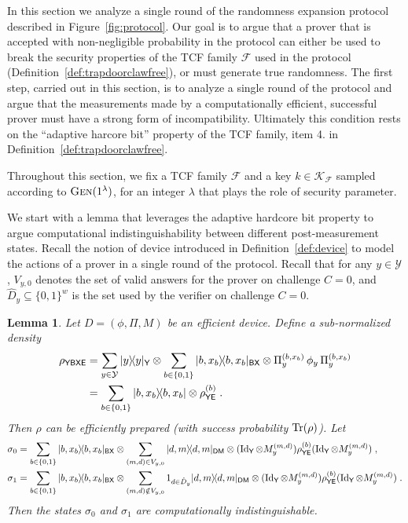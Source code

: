 \documentclass[11pt]{article}
\newtheorem{lemma}[theorem]{Lemma}
\theoremstyle{remark}
\theoremstyle{definition}
\newcommand{\ket}[1]{|#1\rangle}
\newcommand{\bra}[1]{\langle#1|}
\newcommand{\proj}[1]{\ket{#1}\!\bra{#1}}
\newcommand{\Tr}{\mbox{\rm Tr}}
\newcommand{\Id}{\ensuremath{\mathop{\rm Id}\nolimits}}
\newcommand{\reg}[1]{{\textsf{#1}}}
\newcommand{\mF}{\ensuremath{\mathcal{F}}}
\newcommand{\mK}{\ensuremath{\mathcal{K}}}
\newcommand{\mY}{\ensuremath{\mathcal{Y}}}
\newcommand{\Gen}{\textsc{Gen}}
\begin{document}
In this section we analyze a single round of the randomness expansion protocol described in Figure~\ref{fig:protocol}. Our goal is to argue that a prover that is accepted with non-negligible probability in the protocol can either be used to break the security properties of the TCF family $\mathcal{F}$ used in the protocol (Definition~\ref{def:trapdoorclawfree}), or must generate true randomness. The first step, carried out in this section, is to analyze a single round of the protocol and argue that the measurements made by a computationally efficient, successful prover must have a strong form of incompatibility. Ultimately this condition rests on the ``adaptive harcore bit'' property of the TCF family, item 4. in Definition~\ref{def:trapdoorclawfree}. 

Throughout this section, we fix a TCF family $\mathcal{F}$ and a key $k\in \mK_\mF$ sampled according to $\Gen(1^\lambda)$, for an integer $\lambda$ that plays the role of security parameter. 

We start with a lemma that leverages the adaptive hardcore bit property to argue computational indistinguishability between different post-measurement states. Recall the notion of device introduced in Definition~\ref{def:device} to model the actions of a prover in a single round of the protocol. 
Recall that for any $y\in\mY$, $V_{y,0}$ denotes the set of valid answers for the prover on challenge $C=0$, and $\hat{D}_y\subseteq\{0,1\}^w$ is the set used by the verifier on challenge $C=0$. 

\begin{lemma} \label{lem:break}
Let $D = (\phi,\Pi,M)$ be an efficient device. Define a sub-normalized density 
\begin{align}
\rho_{\reg{YBXE}} &= \sum_{y\in\mY} \proj{y}_\reg{Y}\otimes \sum_{b\in\{0,1\}} \proj{b,x_b}_\reg{BX} \otimes \Pi_y^{(b,x_b)} \,\phi_y \,\Pi_y^{(b,x_b)}\notag\\
&=  \sum_{b\in\{0,1\}} \proj{b,x_b} \otimes \rho^{(b)}_\reg{YE}\;.\label{eq:def-sigmay}
\end{align}
Then $\rho$ can be efficiently prepared (with success probability $\Tr(\rho)$). Let
\begin{align}
\sigma_0 &=\sum_{b\in\{0,1\}} \proj{b,x_b}_{\reg{BX}} \otimes  \sum_{(m,d) \in {V}_{y,0}} \proj{d,m}_{\reg{DM}}\otimes (\Id_\reg{Y}\otimes M_y^{(m,d)}) \rho^{(b)}_{\reg{YE}} (\Id_\reg{Y}\otimes M_y^{(m,d)})\;,\notag\\
 \sigma_1 &=\sum_{b\in\{0,1\}} \proj{b,x_b}_{\reg{BX}} \otimes  \sum_{(m,d)\notin V_{y,0}} 1_{d\in \hat{D}_{y} } \proj{d,m}_{\reg{DM}}\otimes (\Id_\reg{Y}\otimes M_y^{(m,d)}) \rho^{(b)}_{\reg{YE}} (\Id_\reg{Y}\otimes M_y^{(m,d)})\;.\label{eq:def-rho}
\end{align}
Then the states $\sigma_0$ and $\sigma_1$ are computationally indistinguishable. 
\end{lemma}
\end{document}
